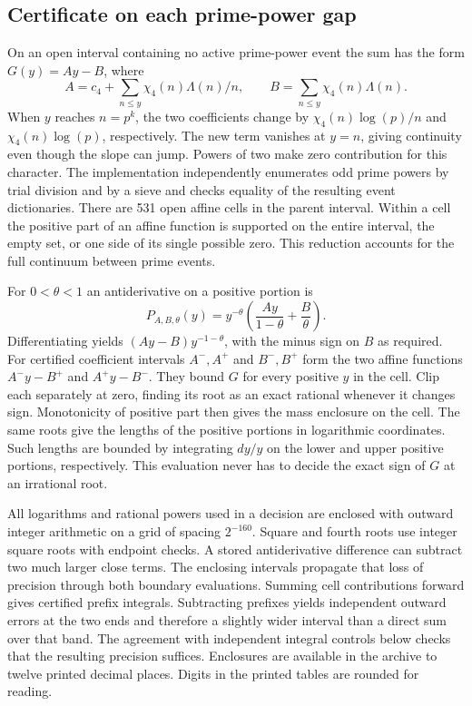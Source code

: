 \documentclass[12pt,letterpaper]{article}
\begin{document}
\subsection{Certificate on each prime-power gap}

On an open interval containing no active prime-power event the sum has the form $G(y)=Ay-B$, where
\[
 A=c_4+\sum_{n\leq y}\chi_4(n)\Lambda(n)/n,
 \qquad B=\sum_{n\leq y}\chi_4(n)\Lambda(n).
\]
When $y$ reaches $n=p^k$, the two coefficients change by $\chi_4(n)\log(p)/n$ and $\chi_4(n)\log(p)$, respectively. The new term vanishes at $y=n$, giving continuity even though the slope can jump. Powers of two make zero contribution for this character. The implementation independently enumerates odd prime powers by trial division and by a sieve and checks equality of the resulting event dictionaries. There are 531 open affine cells in the parent interval. Within a cell the positive part of an affine function is supported on the entire interval, the empty set, or one side of its single possible zero. This reduction accounts for the full continuum between prime events.

For $0<\theta<1$ an antiderivative on a positive portion is
\[
 P_{A,B,\theta}(y)
   =y^{-\theta}\left(\frac{Ay}{1-\theta}+\frac{B}{\theta}\right).
\]
Differentiating yields $(Ay-B)y^{-1-\theta}$, with the minus sign on $B$ as required. For certified coefficient intervals $A^-,A^+$ and $B^-,B^+$ form the two affine functions $A^- y-B^+$ and $A^+y-B^-$. They bound $G$ for every positive $y$ in the cell. Clip each separately at zero, finding its root as an exact rational whenever it changes sign. Monotonicity of positive part then gives the mass enclosure on the cell. The same roots give the lengths of the positive portions in logarithmic coordinates. Such lengths are bounded by integrating $dy/y$ on the lower and upper positive portions, respectively. This evaluation never has to decide the exact sign of $G$ at an irrational root.

All logarithms and rational powers used in a decision are enclosed with outward integer arithmetic on a grid of spacing $2^{-160}$. Square and fourth roots use integer square roots with endpoint checks. A stored antiderivative difference can subtract two much larger close terms. The enclosing intervals propagate that loss of precision through both boundary evaluations. Summing cell contributions forward gives certified prefix integrals. Subtracting prefixes yields independent outward errors at the two ends and therefore a slightly wider interval than a direct sum over that band. The agreement with independent integral controls below checks that the resulting precision suffices. Enclosures are available in the archive to twelve printed decimal places. Digits in the printed tables are rounded for reading.
\end{document}
